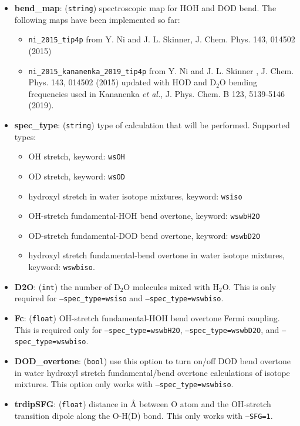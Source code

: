 \documentclass{article}
\begin{document}
\begin{itemize}
\item \textbf{bend\_map}: (\texttt{string}) spectroscopic map for HOH and DOD bend. 
The following maps have been implemented so far:
\begin{itemize}
\item \texttt{ni\_2015\_tip4p} from Y. Ni and J. L. Skinner, J. Chem. Phys. 143, 014502 (2015)
\item  \texttt{ni\_2015\_kananenka\_2019\_tip4p} from Y. Ni and J. L. Skinner , J. Chem. Phys. 143, 014502 (2015) updated with HOD and D$_2$O 
bending frequencies used in Kananenka \textit{et al.}, J. Phys. Chem. B 123, 5139-5146 (2019).
\end{itemize}


\item \textbf{spec\_type}: (\texttt{string}) type of calculation that will be performed. Supported types:
\begin{itemize}
\item OH stretch, keyword: \texttt{wsOH}
\item OD stretch, keyword: \texttt{wsOD}
\item hydroxyl stretch in water isotope mixtures, keyword: \texttt{wsiso}
\item OH-stretch fundamental-HOH bend overtone, keyword: \texttt{wswbH2O}
\item OD-stretch fundamental-DOD bend overtone, keyword: \texttt{wswbD2O}
\item hydroxyl stretch fundamental-bend overtone in water isotope mixtures, keyword: \texttt{wswbiso}.
\end{itemize}

\item \textbf{D2O}: (\texttt{int}) the number of D$_2$O molecules mixed with H$_2$O. This is only required for \texttt{--spec\_type=wsiso}
and  \texttt{--spec\_type=wswbiso}.

\item \textbf{Fc}: (\texttt{float}) OH-stretch fundamental-HOH bend overtone Fermi coupling. This is  required only for \texttt{--spec\_type=wswbH2O},
\texttt{--spec\_type=wswbD2O}, and \texttt{--spec\_type=wswbiso}.

\item \textbf{DOD\_overtone}: (\texttt{bool}) use this option to turn on/off DOD bend overtone in water hydroxyl stretch fundamental/bend overtone
calculations of isotope mixtures. This option only works with \texttt{--spec\_type=wswbiso}.

\item \textbf{trdipSFG}: (\texttt{float}) distance in \AA{} between O atom and the
OH-stretch transition dipole along the O-H(D) bond. This only works with  
\texttt{--SFG=1}.


\end{itemize}
\end{document}
